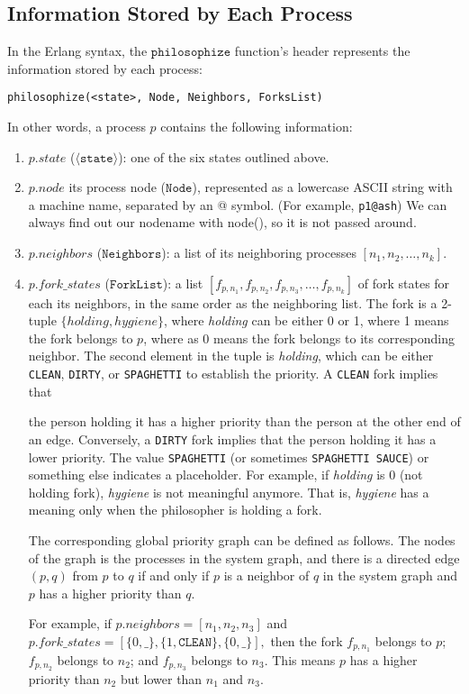 \documentclass[11pt]{article}
\begin{document}
\subsection{Information Stored by Each Process}
In the Erlang syntax, the $\texttt{philosophize}$ function's header represents
the information stored by each process:
\begin{lstlisting}
philosophize(<state>, Node, Neighbors, ForksList)
\end{lstlisting}
In other words, a process $p$ contains the following information:
\begin{enumerate}
\item $p.state$ ($\langle\texttt{state}\rangle$): one of the six states outlined above.
\item $p.node$ its process node ($\texttt{Node}$), represented as a lowercase ASCII string with a machine name, separated by an @ symbol. (For example, \texttt{p1@ash}) We can always find out our nodename with node(), so it is not passed around.
\item $p.neighbors$ ($\texttt{Neighbors}$): a list of its neighboring processes $[n_1, n_2, \ldots, n_k]$.
\item $p.fork\_states$ ($\texttt{ForkList}$): a list $[f_{p, n_1}, f_{p, n_2}, f_{p, n_3}, \ldots, f_{p, n_k}]$ of fork states for each its neighbors, in the same order as the neighboring list. The fork is a 2-tuple $\{holding, hygiene\}$, where \emph{holding} can be either 0 or 1, where 1 means the fork belongs to $p$, where as 0 means the fork belongs to its corresponding neighbor. The second element in the tuple is \emph{holding}, which can be either \texttt{CLEAN}, \texttt{DIRTY}, or \texttt{SPAGHETTI} to establish the priority. A \texttt{CLEAN} fork implies that

the person holding it has a higher priority than the person at the other end of an edge. Conversely, a \texttt{DIRTY} fork implies that the person holding it has a lower priority. The value \texttt{SPAGHETTI} (or sometimes \texttt{SPAGHETTI SAUCE}) or something else indicates a placeholder. For example, if \emph{holding} is 0 (not holding fork), \emph{hygiene} is not meaningful anymore. That is, \emph{hygiene} has a meaning only when the philosopher is holding a fork.

The corresponding global priority graph can be defined as follows. The nodes of the graph is the processes in the system graph, and there is a directed edge $(p, q)$ from $p$ to $q$ if and only if $p$ is a neighbor of $q$ in the system graph and $p$ has a higher priority than $q$.

For example, if $p.neighbors = [n_1, n_2, n_3]$ and $p.fork\_states = [\{0, \_\}, \{1, \texttt{CLEAN}\}, \{0, \_\}],$ then the fork $f_{p, n_1}$ belongs to $p$; $f_{p, n_2}$ belongs to $n_2$; and $f_{p, n_3}$ belongs to $n_3$. This means $p$ has a higher priority than $n_2$ but lower than $n_1$ and $n_3$.
\end{enumerate}
\end{document}
